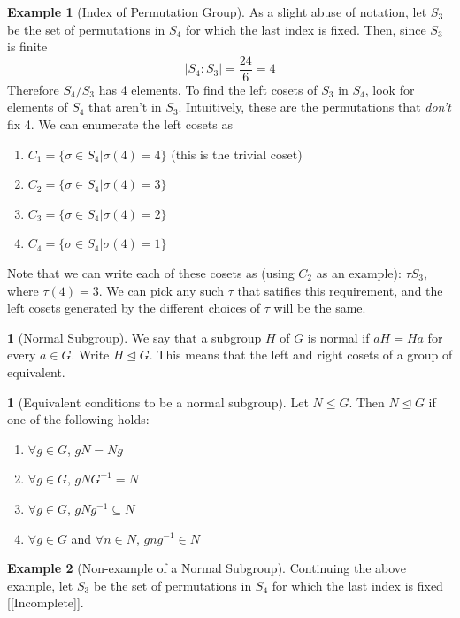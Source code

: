 \documentclass[12pt]{article}
\theoremstyle{definition}
\newtheorem{definition}{\color{NavyBlue}{\textbf{Definition}}}
\newtheorem{theorem}{\color{ForestGreen}{\textbf{Theorem}}}
\newtheorem{example}{\color{WildStrawberry}Example}
\theoremstyle{definition}
\begin{document}
\begin{example}[Index of Permutation Group]
As a slight abuse of notation, let $S_3$ be the set of permutations in $S_4$ for which the last index is fixed. Then, since $S_3$ is finite
\begin{equation}
 	|S_4 : S_3| = \frac{24}{6} = 4
\end{equation} 
Therefore $S_4 / S_3$ has 4 elements. To find the left cosets of $S_3$ in $S_4$, look for elements of $S_4$ that aren't in $S_3$. Intuitively, these are the permutations that \textit{don't} fix 4. We can enumerate the left cosets as
\begin{enumerate}
	\item $C_1 = \{\sigma \in S_4 | \sigma(4) = 4 \}$ (this is the trivial coset)
	\item $C_2 = \{\sigma \in S_4 | \sigma(4) = 3 \}$
	\item $C_3 = \{\sigma \in S_4 | \sigma(4) = 2 \}$
	\item $C_4 = \{\sigma \in S_4 | \sigma(4) = 1 \}$
\end{enumerate}
Note that we can write each of these cosets as (using $C_2$ as an example): $\tau S_3$, where $\tau(4) = 3$. We can pick any such $\tau$ that satifies this requirement, and the left cosets generated by the different choices of $\tau$ will be the same.
\end{example}

\begin{definition}[Normal Subgroup]
We say that a subgroup $H$ of $G$ is normal if $aH = Ha$ for every $a \in G$. Write $H \trianglelefteq G$. This means that the left and right cosets of a group of equivalent.
\end{definition}

\begin{theorem}[Equivalent conditions to be a normal subgroup]
Let $N \leq G$. Then $N \trianglelefteq G$ if one of the following holds:
\begin{enumerate}
	\item $\forall g\in G$, $gN = Ng$
	\item $\forall g\in G$, $gNG^{-1} = N$
	\item $\forall g\in G$, $gNg^{-1} \subseteq N$
	\item $\forall g\in G$ and $\forall n\in N$, $gng^{-1} \in N$
\end{enumerate}
\end{theorem}

\begin{example}[Non-example of a Normal Subgroup]
Continuing the above example, let $S_3$ be the set of permutations in $S_4$ for which the last index is fixed [[Incomplete]].
\end{example}
\end{document}
